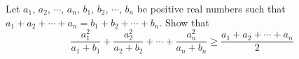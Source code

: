 \begin{problem}[APMO,1991]
Let $a_1$, $a_2$, $\cdots$, $a_n$, $b_1$, $b_2$, $\cdots$, $b_n$ be positive real numbers such that $a_1 + a_2 + \cdots + a_n = b_1 + b_2 + \cdots + b_n$. Show that
\[ \frac{a_1^2}{a_1 + b_1} + \frac{a_2^2}{a_2 + b_2} + \cdots + \frac{a_n^2}{a_n + b_n} \geq \frac{a_1 + a_2 + \cdots + a_n}{2} \]
    \begin{hint}
    \addhint{}
    \addhint{}
    \end{hint}
\end{problem}


